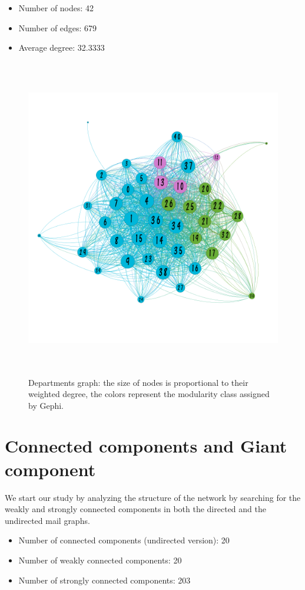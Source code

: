 \documentclass{report}
\theoremstyle{definition}
\theoremstyle{remark}
\begin{document}
\begin{itemize}
	\item Number of nodes: 42
	\item Number of edges: 679
	\item Average degree: 32.3333
\end{itemize}
\begin{figure} [H]
	\centering
	\centerline{\includegraphics[width = 12cm, height = 14cm, keepaspectratio]{Departments_graph.png}}
	\label{Department}
	\caption{Departments graph: the size of nodes is proportional to their weighted degree, the colors represent the modularity class assigned by Gephi.}
\end{figure}
\section*{Connected components and Giant component}

We start our study by analyzing the structure of the network by searching for the weakly and strongly connected components in both the directed and the undirected mail graphs.
\begin{itemize}
	\item Number of connected components (undirected version): 20
	\item Number of weakly connected components: 20
	\item Number of strongly connected components: 203
\end{itemize}
\end{document}
